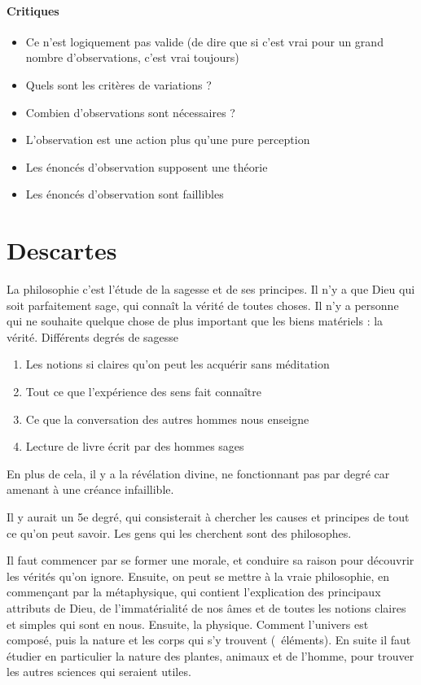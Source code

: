 \documentclass[fleqn,letterpaper, 12pt]{article}
\begin{document}
	\paragraph{Critiques}
	\begin{itemize}
		\item Ce n'est logiquement pas valide (de dire que si c'est vrai pour un grand nombre d'observations, c'est vrai toujours)
		\item Quels sont les critères de variations ?
		\item Combien d'observations sont nécessaires ?
		\item L'observation est une action plus qu'une pure perception
		\item Les énoncés d'observation supposent une théorie
		\item Les énoncés d'observation sont faillibles
	\end{itemize}
	
	
	\section{Descartes}
	
	La philosophie c'est l'étude de la sagesse et de ses principes. Il n'y a que Dieu qui soit parfaitement sage, qui connaît la vérité de toutes choses. Il n'y a personne qui ne souhaite quelque chose de plus important que les biens matériels : la vérité.
	Différents degrés de sagesse
	\begin{enumerate}
		\item Les notions si claires qu'on peut les acquérir sans méditation
		\item Tout ce que l'expérience des sens fait connaître
		\item Ce que la conversation des autres hommes nous enseigne
		\item Lecture de livre écrit par des hommes sages
	\end{enumerate}
	En plus de cela, il y a la révélation divine, ne fonctionnant pas par degré car amenant à une créance infaillible.
	
	Il y aurait un 5e degré, qui consisterait à chercher les causes et principes de tout ce qu'on peut savoir. Les gens qui les cherchent sont des philosophes.
	
	Il faut commencer par se former une morale, et conduire sa raison pour découvrir les vérités qu'on ignore. Ensuite, on peut se mettre à la vraie philosophie, en commençant par la métaphysique, qui contient l'explication des principaux attributs de Dieu, de l'immatérialité de nos âmes et de toutes les notions claires et simples qui sont en nous. Ensuite, la physique. Comment l'univers est composé, puis la nature et les corps qui s'y trouvent (~éléments). En suite il faut étudier en particulier la nature des plantes, animaux et de l'homme, pour trouver les autres sciences qui seraient utiles.
	
\end{document}
